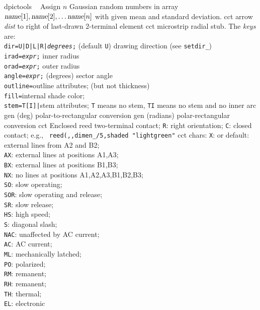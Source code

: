 %

%
  {dpictools}%
  {$\;\;$ Assign $n$ Gaussian random numbers in array
   $\hbox{\sl name}[1], \hbox{\sl name}[2], \ldots \hbox{\sl name}[n]$
   with given mean and standard deviation.}%
%
  {cct}%
  {arrow {\sl dist} to right of last-drawn 2-terminal element
   }%
%
  {cct}%
  {microstrip radial stub. The {\sl keys} are:\\
   {\tt dir=U|D|L|R|{\sl degrees};}
    (default {\tt U}) drawing direction (see {\tt setdir\_})\\
   {\tt irad={\sl expr};} inner radius\\
   {\tt orad={\sl expr};} outer radius\\
   {\tt angle={\sl expr};} (degrees) sector angle\\
   {\tt outline=}outline attributes; (but not thickness)\\
   {\tt fill=}internal shade color;\\
   {\tt stem=T[I]|}stem attributes; {\tt T} means no stem,
   {\tt TI} means no stem and no inner arc
 }%
%
  {gen}%
  {(deg) polar-to-rectangular conversion}%
%
  {gen}%
  {(radians) polar-rectangular conversion}%
%
  {cct}%
  {Enclosed reed two-terminal contact;
   {\tt R}: right orientation; {\tt C}: closed contact; e.g., {\tt
   reed(,{,}dimen\_/5,shaded "lightgreen"} }%
%
  {cct}%
  {chars:
    {\tt X}: or default: external lines from A2 and B2;\\
    {\tt AX}: external lines at positions A1,A3;\\
    {\tt BX}: external lines at positions B1,B3;\\
    {\tt NX}: no lines at positions A1,A2,A3,B1,B2,B3;\\
    {\tt SO}: slow operating;\\
    {\tt SOR}: slow operating and release;\\
    {\tt SR}: slow release;\\
    {\tt HS}: high speed;\\
    {\tt S}:  diagonal slash;\\
    {\tt NAC}: unaffected by AC current;\\
    {\tt AC}: AC current;\\
    {\tt ML}: mechanically latched;\\
    {\tt PO}: polarized;\\
    {\tt RM}: remanent;\\
    {\tt RH}: remanent;\\
    {\tt TH}: thermal;\\
    {\tt EL}: electronic
   }%
